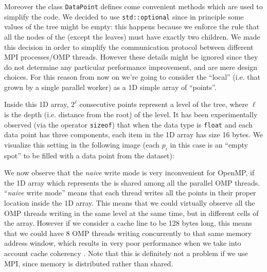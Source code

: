 \documentclass{article}
\begin{document}
Moreover the class \texttt{DataPoint} defines come convenient methods which are
used to simplify the code. We decided to use \texttt{std::optional} since in
principle some values of the tree might be empty: this happens because we
enforce the rule that all the nodes of the \kdtree{} (except the leaves) must
have exactly two children. We made this decision in order to simplify the
communication protocol between different MPI processes/OMP threads. However
these details might be ignored since they do not determine any particular
performance improvement, and are mere design choices. For this reason from now
on we're going to consider the ``local'' \kdtree{} (i.e. that grown by a single
parallel worker) as a 1D simple array of ``points''.

Inside this 1D array, $2^\ell$ consecutive points represent a level of the
tree, where $\ell$ is the depth (i.e. distance from the root) of the level.
It has been experimentally observed (via the operator \texttt{sizeof}) that when
the data type is \texttt{float} and each data point has three components, each
item in the 1D array has size 16 bytes. We visualize this setting in the
following image (each $p_i$ in this case is an ``empty spot'' to be filled with
a data point from the dataset):

\begin{figure}[H]
    \centering
\end{figure}

We now observe that the \emph{naive} write mode is very inconvenient for OpenMP,
if the 1D array which represents the \kdtree{} is shared among all the parallel
OMP threads. ``\emph{naive} write mode'' means that each thread writes all the
points in their proper location inside the 1D array. This means that we could
virtually observe all the OMP threads writing in the same \kdtree{} level at
the same time, but in different cells of the array. However if we consider
a cache line to be 128 bytes long, this means that we could have 8 OMP threads
writing concurrently to that same memory address window, which results in very
poor performance when we take into account cache coherency
\cite{hager2010introduction}. Note that this is definitely not a problem if we
use MPI, since memory is distributed rather than shared.
\end{document}
